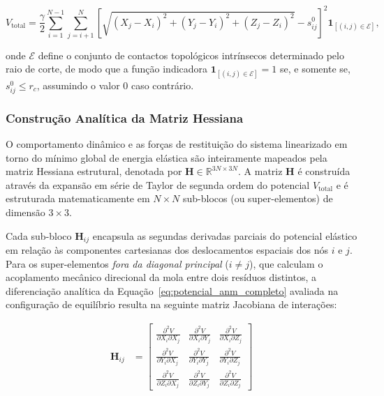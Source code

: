 \documentclass[12pt, a4paper]{article}
\begin{document}
\begin{equation}\label{eq:potencial_anm_completo}
    V_{\text{total}} = \frac{\gamma}{2} \sum_{i=1}^{N-1} \sum_{j=i+1}^{N} \left[ \sqrt{(X_j - X_i)^2 + (Y_j - Y_i)^2 + (Z_j - Z_i)^2} - s_{ij}^0 \right]^2 \mathbf{1}_{[(i,j) \in \mathcal{E}]},
\end{equation}

onde $\mathcal{E}$ define o conjunto de contactos topológicos intrínsecos determinado pelo raio de corte, de modo que a função indicadora $\mathbf{1}_{[(i,j) \in \mathcal{E}]} = 1$ se, e somente se, $s_{ij}^0 \leq r_c$, assumindo o valor $0$ caso contrário.

\subsubsection{Construção Analítica da Matriz Hessiana}

O comportamento dinâmico e as forças de restituição do sistema linearizado em torno do mínimo global de energia elástica são inteiramente mapeados pela matriz Hessiana estrutural, denotada por $\mathbf{H} \in \mathbb{R}^{3N \times 3N}$. A matriz $\mathbf{H}$ é construída através da expansão em série de Taylor de segunda ordem do potencial $V_{\text{total}}$ e é estruturada matematicamente em $N \times N$ sub-blocos (ou super-elementos) de dimensão $3 \times 3$.

Cada sub-bloco $\mathbf{H}_{ij}$ encapsula as segundas derivadas parciais do potencial elástico em relação às componentes cartesianas dos deslocamentos espaciais dos nós $i$ e $j$. Para os super-elementos \emph{fora da diagonal principal} ($i \neq j$), que calculam o acoplamento mecânico direcional da mola entre dois resíduos distintos, a diferenciação analítica da Equação~\eqref{eq:potencial_anm_completo} avaliada na configuração de equilíbrio resulta na seguinte matriz Jacobiana de interações:

\begin{equation}\label{eq:hessiana_off_diagonal}
\begin{aligned}
    \mathbf{H}_{ij} &= \begin{bmatrix}
    \frac{\partial^2 V}{\partial X_i \partial X_j} & \frac{\partial^2 V}{\partial X_i \partial Y_j} & \frac{\partial^2 V}{\partial X_i \partial Z_j} \\[6pt]
    \frac{\partial^2 V}{\partial Y_i \partial X_j} & \frac{\partial^2 V}{\partial Y_i \partial Y_j} & \frac{\partial^2 V}{\partial Y_i \partial Z_j} \\[6pt]
    \frac{\partial^2 V}{\partial Z_i \partial X_j} & \frac{\partial^2 V}{\partial Z_i \partial Y_j} & \frac{\partial^2 V}{\partial Z_i \partial Z_j}
    \end{bmatrix}
\end{aligned}
\end{equation}
\end{document}
